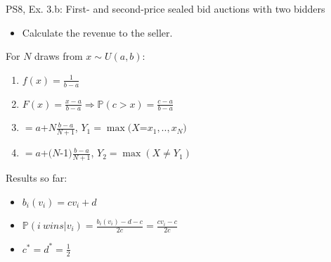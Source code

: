 \begin{frame}{PS8, Ex. 3.b: First- and second-price sealed bid auctions with two bidders}
    \begin{multicols}{2}
      \begin{itemize}
        \item[(b)] Calculate the revenue to the seller.
      \end{itemize}
      \vfill\null\columnbreak
      For $N$ draws from $x\sim U(a, b):$
      \vspace{-6pt}
      \begin{enumerate}
        \item[PDF:] $f(x)=\frac{1}{b-a}$
        \item[CDF:] $F(x)=\frac{x-a}{b-a}\Rightarrow\mathbb{P}(c>x)=\frac{c-a}{b-a}$
        \item[$\mathbb{E}(Y_1)$] $=a$+$N\frac{b-a}{N+1}$, $Y_1=\max(X$=$x_1,..,x_N)$
        \item[$\mathbb{E}(Y_2)$] $=a$+$(N$-1$)\frac{b-a}{N+1}$, $Y_2=\max(X\neq Y_1)$
      \end{enumerate}
      \vspace{-6pt}
      Results so far:
      \vspace{-6pt}
      \begin{itemize}
        \item[($*$)]  $b_i(v_i) = cv_i+d$
        \item[($**$)] $\mathbb{P}(i\ wins|v_i)=\frac{b_i(v_i)-d-c}{2c}=\frac{cv_i-c}{2c}$
        \item[(3.a)]    $c^*=d^*=\frac{1}{2}$
      \end{itemize}
      \vfill\null
    \end{multicols}
\end{frame}

